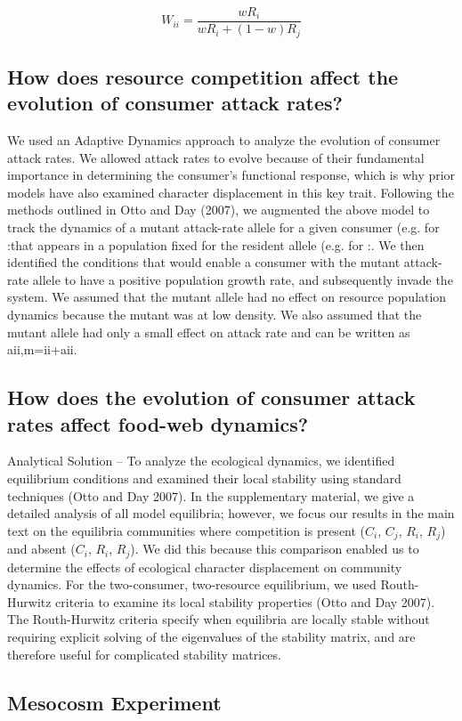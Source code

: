 \documentclass[11pt]{article}
\begin{document}
\[W_{ii}=\frac{wR_i}{wR_i+(1-w)R_j}\]

\subsection*{How does resource competition affect the evolution of consumer attack rates?} 
We used an Adaptive Dynamics approach to analyze the evolution of consumer attack rates. We allowed attack rates to evolve because of their fundamental importance in determining the consumer’s functional response, which is why prior models have also examined character displacement in this key trait. Following the methods outlined in Otto and Day (2007), we augmented the above model to track the dynamics of a mutant attack-rate allele for a given consumer (e.g. for :that appears in a population fixed for the resident allele (e.g. for :. We then identified the conditions that would enable a consumer with the mutant attack-rate allele to have a positive population growth rate, and subsequently invade the system. We assumed that the mutant allele had no effect on resource population dynamics because the mutant was at low density. We also assumed that the mutant allele had only a small effect on attack rate and can be written as aii,m=ii+aii. 

\subsection*{How  does the evolution of consumer attack rates affect food-web dynamics? } 
Analytical Solution -- To analyze the ecological dynamics, we identified equilibrium conditions and examined their local stability using standard techniques (Otto and Day 2007). In the supplementary material, we give a detailed analysis of all model equilibria; however, we focus our results in the main text on the equilibria communities where competition is present ($C_i$, $C_j$, $R_i$, $R_j$) and absent ($C_i$, $R_i$, $R_j$). We did this because this comparison enabled us to determine the effects of ecological character displacement on community dynamics.  For the two-consumer, two-resource equilibrium, we used Routh-Hurwitz criteria to examine its local stability properties (Otto and Day 2007). The Routh-Hurwitz criteria specify when equilibria are locally stable without requiring explicit solving of the eigenvalues of the stability matrix, and are therefore useful for complicated stability matrices.   

\subsection*{Mesocosm Experiment}
\end{document}
